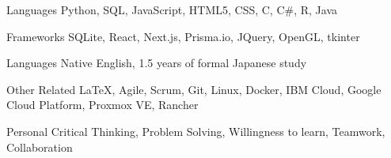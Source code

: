 

\begin{cvskills}

  \cvskill
    {Languages} %
    {Python, SQL, JavaScript, HTML5, CSS, C, C\#, R, Java} %

  \cvskill
    {Frameworks} %
    {SQLite, React, Next.js, Prisma.io, JQuery, OpenGL, tkinter} %

  \cvskill
    {Languages} %
    {Native English, 1.5 years of formal Japanese study} %

  \cvskill
    {Other Related} %
    {LaTeX, Agile, Scrum, Git, Linux, Docker, IBM Cloud, Google Cloud Platform, Proxmox VE, Rancher} %

  \cvskill
    {Personal} %
    {Critical Thinking, Problem Solving, Willingness to learn, Teamwork, Collaboration} %

\end{cvskills}
